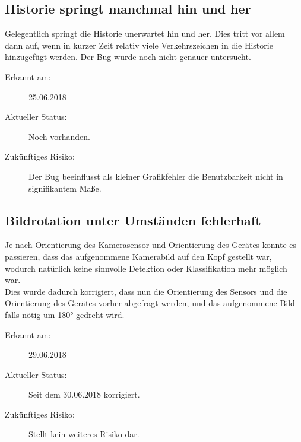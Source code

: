 \documentclass[12pt,a4paper,ngerman,enabledeprecatedfontcommands]{scrreprt}
\begin{document}
\subsection{Historie \glqq{}springt\grqq{} manchmal hin und her}
Gelegentlich springt die Historie unerwartet hin und her. Dies tritt vor allem dann auf, wenn in kurzer Zeit relativ viele Verkehrszeichen in die Historie hinzugefügt werden. Der Bug wurde noch nicht genauer untersucht.

\begin{description}

    \item[Erkannt am:] 25.06.2018
    
    \item[Aktueller Status:] Noch vorhanden.
    
    \item[Zukünftiges Risiko:] Der Bug beeinflusst als kleiner Grafikfehler die Benutzbarkeit nicht in signifikantem Maße.
    
\end{description}
\smallskip

\subsection{Bildrotation unter Umständen fehlerhaft}
Je nach Orientierung des Kamerasensor und Orientierung des Gerätes konnte es passieren, dass das aufgenommene Kamerabild auf den Kopf gestellt war, wodurch natürlich keine sinnvolle \gls{Detektion} oder \gls{Klassifikation} mehr möglich war.\\
Dies wurde dadurch korrigiert, dass nun die Orientierung des Sensors und die Orientierung des Gerätes vorher abgefragt werden, und das aufgenommene Bild falls nötig um 180° gedreht wird.

\begin{description}

    \item[Erkannt am:] 29.06.2018
    
    \item[Aktueller Status:] Seit dem 30.06.2018 korrigiert.
    
    \item[Zukünftiges Risiko:] Stellt kein weiteres Risiko dar.
    
\end{description}
\smallskip
\end{document}
